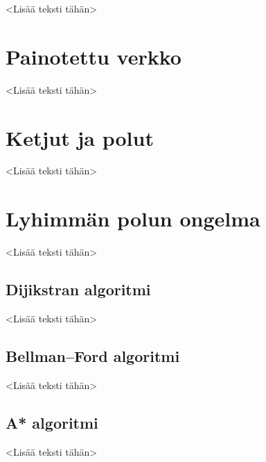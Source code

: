 <Lisää teksti tähän>

\section{Painotettu verkko}

<Lisää teksti tähän>

\section{Ketjut ja polut}

<Lisää teksti tähän>

\section{Lyhimmän polun ongelma}

<Lisää teksti tähän>

  \subsection{Dijikstran algoritmi}

  <Lisää teksti tähän>

  \subsection{Bellman–Ford algoritmi}

  <Lisää teksti tähän>

  \subsection{A* algoritmi}

  <Lisää teksti tähän>
